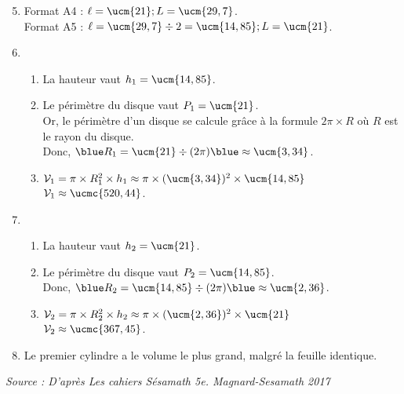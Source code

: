 \begin{colonne*exercice}
\begin{corrige}
\begin{enumerate}
   \setcounter{enumi}{4}
      \item Format A4 : {\blue $\ell =\ucm{21}; L=\ucm{29,7}$}. \\
         Format A5 : {\blue $\ell =\ucm{29,7}\div2 = \ucm{14,85}; L=\ucm{21}$}.
      \item
      \begin{enumerate}
         \item La hauteur vaut {\blue $h_1 =\ucm{14,85}$}.
         \item Le périmètre du disque vaut {\blue $P_1 =\ucm{21}$}. \\
         Or, le périmètre d'un disque se calcule grâce à la formule $2\pi\times R$ où $R$ est le rayon du disque. \\
            Donc,  ${\blue R_1} =\ucm{21}\div(2\pi) {\blue \approx\ucm{3,34}}$.
         \item $\mathcal{V}_1 =\pi\times R_1^2\times h_1 \approx\pi\times(\ucm{3,34})^2\times\ucm{14,85}$ \\
            {\blue $\mathcal{V}_1 \approx\ucmc{520,44}$}.
      \end{enumerate}
      \setcounter{enumi}{6}
      \item
      \begin{enumerate}
         \item La hauteur vaut {\blue $h_2 =\ucm{21}$}.
         \item Le périmètre du disque vaut {\blue $P_2 =\ucm{14,85}$}. \\
            Donc,  ${\blue R_2} =\ucm{14,85}\div(2\pi) {\blue \approx\ucm{2,36}}$.
         \item $\mathcal{V}_2 =\pi\times R_2^2\times h_2 \approx\pi\times(\ucm{2,36})^2\times\ucm{21}$ \\
            {\blue $\mathcal{V}_2 \approx\ucmc{367,45}$}.
      \end{enumerate}
      \setcounter{enumi}{7}
      \item {\blue Le premier cylindre a le volume le plus grand}, malgré la feuille identique.
   \end{enumerate}
\end{corrige}

\smallskip   
\hfill{\it\footnotesize Source : D’après Les cahiers Sésamath 5e. Magnard-Sesamath 2017}

\end{colonne*exercice}


\Recreation


